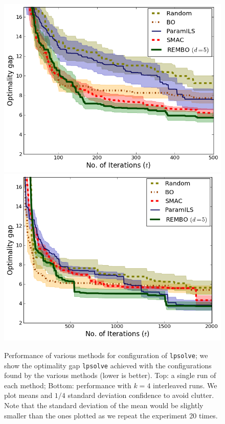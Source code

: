 \documentclass{article}
\begin{document}
\begin{figure}[h!]
\begin{center}
  \includegraphics[scale=0.35]{figures/lpsolve.png}\\
  \includegraphics[scale=0.35]{figures/lpsolve_interleave.png}
  \caption{Performance of various methods for configuration of \texttt{lpsolve}; we show the optimality gap \texttt{lpsolve} achieved with the configurations found by the various methods (lower is better). Top: a single run of each method; Bottom: performance with $k=4$ interleaved runs. We plot means and $1/4$ standard deviation confidence to avoid clutter. Note that the standard deviation of the mean would be slightly smaller
  than the ones plotted as we repeat the experiment 20 times.}
\end{center}
\vspace*{-3mm}
\label{fig:lpsolve} 
\end{figure}
\end{document}
